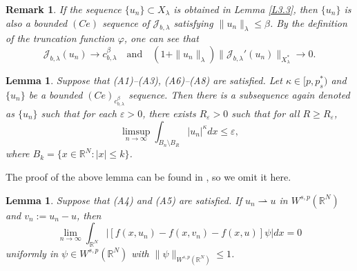 \documentclass[10pt,a4paper]{amsart}
\numberwithin{equation}{section}
\newtheorem{lemma}[theorem]{Lemma}
\newtheorem{remark}[theorem]{Remark}
\begin{document}
\begin{remark}  \label{rmk3.4} \rm
If the sequence $\{u_n\}\subset X_\lambda$ is obtained in Lemma \ref{L3.3}, 
then $\{u_n\}$ is also a bounded $(Ce)$ sequence of $\mathcal{J}_{b,\lambda}$ satisfying 
$\|u_n\|_\lambda\leq \beta$. By the definition of the truncation function $\varphi$, 
one can see that
\[
\mathcal{J}_{b,\lambda}(u_n)\to  c_{b,\lambda}^\beta\quad \text{and}\quad
 (1+\|u_n\|_\lambda)\|\mathcal{J}_{b,\lambda}'(u_n)\|_{X_\lambda^*}\to  0.
\]
\end{remark}

\begin{lemma}\label{L3.5}
Suppose that {\rm (A1)--(A3), (A6)--(A8)} are satisfied.
Let $\kappa\in[p, p^*_s)$ and $\{u_n\}$ be a bounded $(Ce)_{c_{b,\lambda}^\beta}$ 
sequence. Then there is a subsequence again denoted as $\{u_n\}$ such that for each 
$\varepsilon>0$, there exists $R_\varepsilon>0$ such that for all 
$R\geq R_\varepsilon$,
$$
\limsup_{n\to \infty}\int_{B_n\setminus B_R}|u_n|^\kappa dx\leq \varepsilon,
$$
where $B_k=\{x\in\mathbb{R}^N: |x|\leq k\}$.
\end{lemma}

The  proof of the above lemma can be found in  \cite{r15}, so we omit it here.

\begin{lemma}\label{L3.6}
Suppose that {\rm (A4)} and {\rm (A5)} are satisfied.
If $u_n \rightharpoonup u$ in $W^{s,p}(\mathbb{R}^N)$ and $v_n:=u_n-u$, then
$$
\lim_{n\to \infty}\int_{\mathbb{R}^N} |[f(x,u_n)-f(x,v_n)-f(x,u)]\psi|dx=0
$$
uniformly in $\psi\in W^{s,p}(\mathbb{R}^N)$ with 
$\|\psi\|_{W^{s,p}(\mathbb{R}^N)}\leq1$.
\end{lemma}
\end{document}
